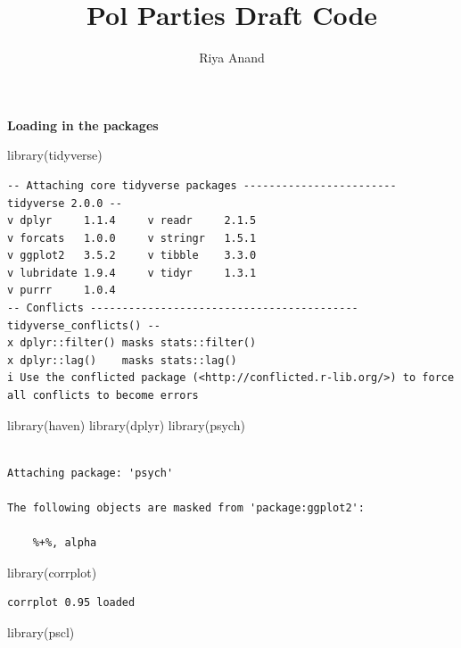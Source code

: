 \documentclass[
  letterpaper,
  DIV=11,
  numbers=noendperiod]{scrartcl}
\title{Pol Parties Draft Code}
\author{Riya Anand}
\date{}
\newenvironment{Shaded}{\begin{snugshade}}{\end{snugshade}}
\newcommand{\FunctionTok}[1]{\textcolor[rgb]{0.28,0.35,0.67}{#1}}
\newcommand{\NormalTok}[1]{\textcolor[rgb]{0.00,0.23,0.31}{#1}}
\begin{document}
\maketitle


\textbf{Loading in the packages}

\begin{Shaded}
\begin{Highlighting}[]
\FunctionTok{library}\NormalTok{(tidyverse)}
\end{Highlighting}
\end{Shaded}

\begin{verbatim}
-- Attaching core tidyverse packages ------------------------ tidyverse 2.0.0 --
v dplyr     1.1.4     v readr     2.1.5
v forcats   1.0.0     v stringr   1.5.1
v ggplot2   3.5.2     v tibble    3.3.0
v lubridate 1.9.4     v tidyr     1.3.1
v purrr     1.0.4     
-- Conflicts ------------------------------------------ tidyverse_conflicts() --
x dplyr::filter() masks stats::filter()
x dplyr::lag()    masks stats::lag()
i Use the conflicted package (<http://conflicted.r-lib.org/>) to force all conflicts to become errors
\end{verbatim}

\begin{Shaded}
\begin{Highlighting}[]
\FunctionTok{library}\NormalTok{(haven)}
\FunctionTok{library}\NormalTok{(dplyr)}
\FunctionTok{library}\NormalTok{(psych)}
\end{Highlighting}
\end{Shaded}

\begin{verbatim}

Attaching package: 'psych'

The following objects are masked from 'package:ggplot2':

    %+%, alpha
\end{verbatim}

\begin{Shaded}
\begin{Highlighting}[]
\FunctionTok{library}\NormalTok{(corrplot)}
\end{Highlighting}
\end{Shaded}

\begin{verbatim}
corrplot 0.95 loaded
\end{verbatim}

\begin{Shaded}
\begin{Highlighting}[]
\FunctionTok{library}\NormalTok{(pscl)}
\end{Highlighting}
\end{Shaded}
\end{document}
